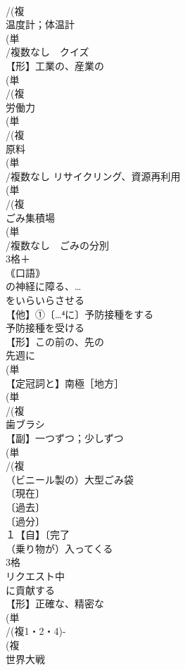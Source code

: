\documentclass[8pt]{extreport}
\begin{document}
\begin{CJK}{UTF8}{min}
\\	/(複
\\	温度計；体温計
\\	(単
\\	/複数なし　クイズ
\\	【形】工業の、産業の
\\	(単
\\	/(複
\\	労働力
\\	(単
\\	/(複
\\	原料
\\	(単
\\	/複数なし リサイクリング、資源再利用 
\\	(単
\\	/(複
\\	ごみ集積場 
\\	(単
\\	/複数なし　ごみの分別
\\	3格＋
\\	｟口語｠ 
\\	の神経に障る、…
\\	をいらいらさせる
\\	【他】①〔…⁴に〕予防接種をする 
\\	予防接種を受ける
\\	【形】この前の、先の 
\\	先週に
\\	(単
\\	【定冠詞と】南極［地方］
\\	(単
\\	/(複
\\	歯ブラシ 
\\	【副】一つずつ；少しずつ
\\	(単
\\	/(複
\\	（ビニール製の）大型ごみ袋 
\\	〔現在〕
\\	〔過去〕
\\	〔過分〕
\\	１【自】〔完了
\\	（乗り物が）入ってくる
\\	3格 
\\	リクエスト中	
\\	に貢献する
\\	【形】正確な、精密な 
\\	(単
\\	/(複1・2・4)-
\\	(複
\\	世界大戦

\end{CJK}
\end{document}
